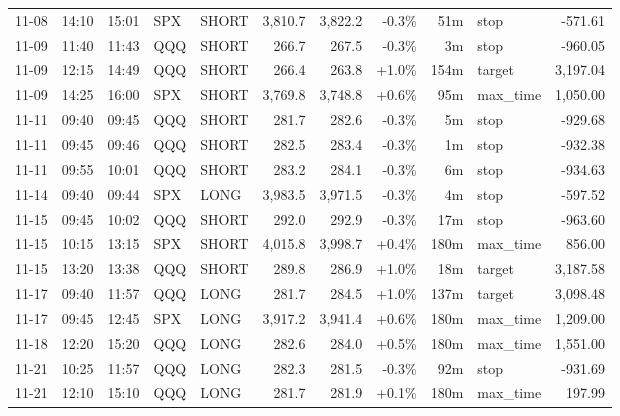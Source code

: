 \documentclass[11pt,a4paper,twoside]{article}
\begin{document}
\begin{center}
\begin{longtable}{>{\color{txtmain}}l l l l l r r r r >{\color{txtmain}}l r}
11-08 & 14:10 & 15:01 & SPX & SHORT & 3,810.7 & 3,822.2 & \textcolor{lossred}{-0.3\%} & 51m & stop & \textcolor{lossred}{-571.61} \\
11-09 & 11:40 & 11:43 & QQQ & SHORT & 266.7 & 267.5 & \textcolor{lossred}{-0.3\%} & 3m & stop & \textcolor{lossred}{-960.05} \\
11-09 & 12:15 & 14:49 & QQQ & SHORT & 266.4 & 263.8 & \textcolor{wingreen}{+1.0\%} & 154m & target & \textcolor{wingreen}{3,197.04} \\
11-09 & 14:25 & 16:00 & SPX & SHORT & 3,769.8 & 3,748.8 & \textcolor{wingreen}{+0.6\%} & 95m & max\_time & \textcolor{wingreen}{1,050.00} \\
11-11 & 09:40 & 09:45 & QQQ & SHORT & 281.7 & 282.6 & \textcolor{lossred}{-0.3\%} & 5m & stop & \textcolor{lossred}{-929.68} \\
11-11 & 09:45 & 09:46 & QQQ & SHORT & 282.5 & 283.4 & \textcolor{lossred}{-0.3\%} & 1m & stop & \textcolor{lossred}{-932.38} \\
11-11 & 09:55 & 10:01 & QQQ & SHORT & 283.2 & 284.1 & \textcolor{lossred}{-0.3\%} & 6m & stop & \textcolor{lossred}{-934.63} \\
11-14 & 09:40 & 09:44 & SPX & LONG & 3,983.5 & 3,971.5 & \textcolor{lossred}{-0.3\%} & 4m & stop & \textcolor{lossred}{-597.52} \\
11-15 & 09:45 & 10:02 & QQQ & SHORT & 292.0 & 292.9 & \textcolor{lossred}{-0.3\%} & 17m & stop & \textcolor{lossred}{-963.60} \\
11-15 & 10:15 & 13:15 & SPX & SHORT & 4,015.8 & 3,998.7 & \textcolor{wingreen}{+0.4\%} & 180m & max\_time & \textcolor{wingreen}{856.00} \\
11-15 & 13:20 & 13:38 & QQQ & SHORT & 289.8 & 286.9 & \textcolor{wingreen}{+1.0\%} & 18m & target & \textcolor{wingreen}{3,187.58} \\
11-17 & 09:40 & 11:57 & QQQ & LONG & 281.7 & 284.5 & \textcolor{wingreen}{+1.0\%} & 137m & target & \textcolor{wingreen}{3,098.48} \\
11-17 & 09:45 & 12:45 & SPX & LONG & 3,917.2 & 3,941.4 & \textcolor{wingreen}{+0.6\%} & 180m & max\_time & \textcolor{wingreen}{1,209.00} \\
11-18 & 12:20 & 15:20 & QQQ & LONG & 282.6 & 284.0 & \textcolor{wingreen}{+0.5\%} & 180m & max\_time & \textcolor{wingreen}{1,551.00} \\
11-21 & 10:25 & 11:57 & QQQ & LONG & 282.3 & 281.5 & \textcolor{lossred}{-0.3\%} & 92m & stop & \textcolor{lossred}{-931.69} \\
11-21 & 12:10 & 15:10 & QQQ & LONG & 281.7 & 281.9 & \textcolor{wingreen}{+0.1\%} & 180m & max\_time & \textcolor{wingreen}{197.99} \\

\end{longtable}
\end{center}
\end{document}
